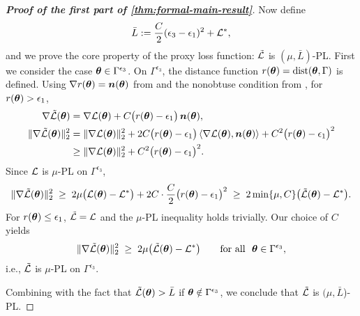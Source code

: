 \begin{proof}[\textbf{Proof of the first part of \cref{thm:formal-main-result}}]
Now define \begin{align*}
    \bar{L} := \frac{C}{2}(\epsilon_3-\epsilon_1)^2 + \mathcal{L}^*, 
\end{align*}and we prove the core property of the proxy loss function: $\tilde{\mathcal{L}}$ is $(\mu,\bar{L})$-PL. First we consider the case ${\bm{\theta}} \in \Gamma^{\epsilon_3}$. On $\Gamma^{\epsilon_3}$, the distance function $r({\bm{\theta}}) = \mathrm{dist}({\bm{\theta}},\Gamma)$ is defined. Using $\nabla r({\bm{\theta}})={\bm{n}}({\bm{\theta}})$ from  and the
nonobtuse condition from , for $r({\bm{\theta}})>\epsilon_1$,
\begin{align*}
  \nabla \tilde{\mathcal{L}}({\bm{\theta}})
  &= \nabla \mathcal{L}({\bm{\theta}}) + C\big(r({\bm{\theta}})-\epsilon_1\big)\,{\bm{n}}({\bm{\theta}}),\\
  \|\nabla \tilde{\mathcal{L}}({\bm{\theta}})\|_2^2
  &= \|\nabla\mathcal{L}({\bm{\theta}})\|_2^2
     + 2C\big(r({\bm{\theta}})-\epsilon_1\big)\,\langle \nabla\mathcal{L}({\bm{\theta}}),{\bm{n}}({\bm{\theta}})\rangle
     + C^2\big(r({\bm{\theta}})-\epsilon_1\big)^2 \\
  &\ge \|\nabla\mathcal{L}({\bm{\theta}})\|_2^2 + C^2\big(r({\bm{\theta}})-\epsilon_1\big)^2.
\end{align*}
Since $\mathcal{L}$ is $\mu$-PL on $\Gamma^{\epsilon_3}$,
\begin{align*}
  \|\nabla \tilde{\mathcal{L}}({\bm{\theta}})\|_2^2
  \;\ge\; 2\mu\big(\mathcal{L}({\bm{\theta}})-\mathcal{L}^*\big) + 2C\cdot \frac{C}{2}\big(r({\bm{\theta}})-\epsilon_1\big)^2
  \;\ge\; 2\min\{\mu,C\}\big(\tilde{\mathcal{L}}({\bm{\theta}})-\mathcal{L}^*\big).
\end{align*}
For $r({\bm{\theta}})\le \epsilon_1$, $\tilde{\mathcal{L}}=\mathcal{L}$ and the $\mu$-PL inequality holds
trivially. Our choice of $C$ yields
\begin{align*}
  \|\nabla \tilde{\mathcal{L}}({\bm{\theta}})\|_2^2
  \;\ge\; 2\mu\big(\tilde{\mathcal{L}}({\bm{\theta}})-\mathcal{L}^*\big)
  \qquad \text{for all }\ {\bm{\theta}}\in\Gamma^{\epsilon_3},
\end{align*}
i.e., $\tilde{\mathcal{L}}$ is $\mu$-PL on $\Gamma^{\epsilon_3}$. 

Combining with the fact that $\tilde{\mathcal{L}}({\bm{\theta}}) > \bar{L}$ if ${\bm{\theta}} \notin \Gamma^{\epsilon_3}$, we conclude that $\tilde{\mathcal{L}}$ is $(\mu,\bar{L}$)-PL. 


\end{proof}
